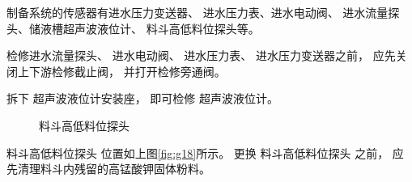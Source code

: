 \documentclass[UTF8,a4paper,12pt,titlepage]{ctexart}
\begin{document}
            制备系统的传感器有进水压力变送器、
            进水压力表、进水电动阀、
            进水流量探头、储液槽超声波液位计、
            料斗高低料位探头等。

            \par 检修进水流量探头、
            进水电动阀、
            进水压力表、
            进水压力变送器之前，
            应先关闭上下游检修截止阀，
            并打开检修旁通阀。
            \par 拆下
            超声波液位计安装座， 
            即可检修
            超声波液位计。

            \newpage

            \begin{figure}[h]
                \centering
                \caption{料斗高低料位探头}\label{fig:p20}
            \end{figure}

            \par 料斗高低料位探头
            位置如上图\ref{fig:g18}所示。
            更换
            料斗高低料位探头
            之前，
            应先清理料斗内残留的高锰酸钾固体粉料。
        
\end{document}
